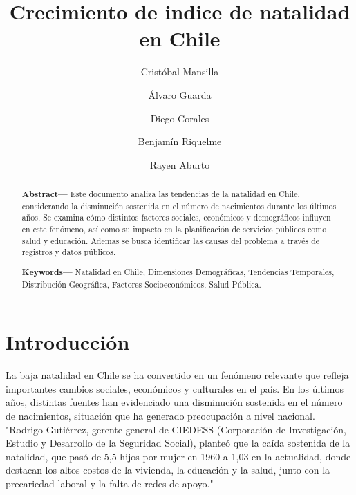 \documentclass[runningheads]{llncs}
\begin{document}
\title{Crecimiento de indice de natalidad en Chile}

\author{
    Cristóbal Mansilla \and 
    Álvaro Guarda \and 
    Diego Corales \and 
    Benjamín Riquelme \and 
    Rayen Aburto
}
%
\maketitle              %
%

\begin{abstract}
\textbf{Abstract—} Este documento analiza las tendencias de la natalidad en Chile, considerando la disminución sostenida en el número de nacimientos durante los últimos años. Se examina cómo distintos factores sociales, económicos y demográficos influyen en este fenómeno, así como su impacto en la planificación de servicios públicos como salud y educación. Ademas se busca identificar las causas del problema a través de registros y datos públicos.

\textbf{Keywords—} Natalidad en Chile, Dimensiones Demográficas, Tendencias Temporales, Distribución Geográfica, Factores Socioeconómicos, Salud Pública.
\end{abstract}

\section{Introducción}
La baja natalidad en Chile se ha convertido en un fenómeno relevante que refleja importantes cambios sociales, económicos y culturales en el país. En los últimos años, distintas fuentes han evidenciado una disminución sostenida en el número de nacimientos, situación que ha generado preocupación a nivel nacional. "Rodrigo Gutiérrez, gerente general de CIEDESS (Corporación de Investigación, Estudio y Desarrollo de la Seguridad Social), planteó que la caída sostenida de la natalidad, que pasó de 5,5 hijos por mujer en 1960 a 1,03 en la actualidad, donde destacan los altos costos de la vivienda, la educación y la salud, junto con la precariedad laboral y la falta de redes de apoyo." \cite{emol2025natalidad}
\end{document}
